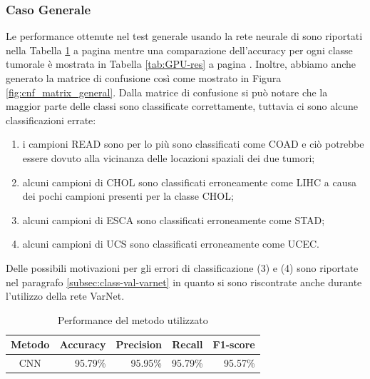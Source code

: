 \subsubsection{Caso Generale}
Le performance ottenute nel test generale usando la rete neurale di \cite{lyu2018deep} sono riportati nella 
Tabella \ref{tab:method_score} a pagina \pageref{tab:method_score} mentre una comparazione dell'accuracy per ogni
classe tumorale è mostrata in Tabella \ref{tab:GPU-res} a pagina \pageref{tab:GPU-res}.
Inoltre, abbiamo anche generato la matrice di confusione così come mostrato in Figura \ref{fig:cnf_matrix_general}.
Dalla matrice di confusione si può notare che la maggior parte delle classi sono classificate correttamente, 
tuttavia ci sono alcune classificazioni errate: 
\begin{enumerate}
    \item i campioni READ sono per lo più sono classificati come COAD e ciò potrebbe essere dovuto alla
          vicinanza delle locazioni spaziali dei due tumori; 
    \item alcuni campioni di CHOL sono classificati erroneamente come LIHC a causa dei pochi campioni presenti per 
          la classe CHOL;
    \item alcuni campioni di ESCA sono classificati erroneamente come STAD;
    \item alcuni campioni di UCS sono classificati erroneamente come UCEC.
\end{enumerate}
Delle possibili motivazioni per gli errori di classificazione (3) e (4) sono riportate nel paragrafo 
\ref{subsec:class-val-varnet} in quanto si sono riscontrate anche durante l'utilizzo della rete VarNet.
\begin{table}[htbp!]
    \centering
    \caption{Performance del metodo utilizzato}
    \begin{tabular}{crrrr}
        \toprule
         Metodo & Accuracy & Precision & Recall & F1-score \\
         \midrule
         CNN    & 95.79\%    & 95.95\%     & 95.79\%  & 95.57\%     \\
         \bottomrule
    \end{tabular}
    \label{tab:method_score}
\end{table}

